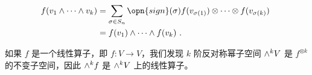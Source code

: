\begin{equation}
\begin{aligned}
f(v_1 \wedge \cdots \wedge v_k) &= \sum_{\sigma \in S_n} \opn{sign}(\sigma) f(v_{\sigma(1)}) \otimes \cdots \otimes f(v_{\sigma(k)}) \\
&= f(v_1) \wedge \cdots \wedge f(v_k)~.
\end{aligned}~
\end{equation}


如果 $f$ 是一个线性算子，即 $f: V \to V$，我们发现 $k$ 阶反对称幂子空间 ${\large \wedge}^k V$ 是 $f^{\otimes k}$ 的不变子空间，因此 ${\large \wedge}^k f$ 是 ${\large \wedge}^k V$ 上的线性算子。



